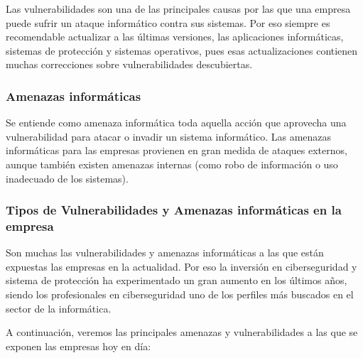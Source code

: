 \documentclass[12pt]{article}
\begin{document}
  Las vulnerabilidades son una de las principales causas por las que una empresa puede sufrir un ataque informático contra sus sistemas. Por eso siempre es recomendable actualizar a las últimas versiones, las aplicaciones informáticas, sistemas de protección y sistemas operativos, pues esas actualizaciones contienen muchas correcciones sobre vulnerabilidades descubiertas. 

  \subsubsection*{Amenazas informáticas}
  Se entiende como amenaza informática toda aquella acción que aprovecha una vulnerabilidad para atacar o invadir un sistema informático. Las amenazas informáticas para las empresas provienen en gran medida de ataques externos, aunque también existen amenazas internas (como robo de información o uso inadecuado de los sistemas).

  \subsubsection*{Tipos de Vulnerabilidades y Amenazas informáticas en la empresa}
  Son muchas las vulnerabilidades y amenazas informáticas a las que están expuestas las empresas en la actualidad. Por eso la inversión en ciberseguridad y sistema de protección ha experimentado un gran aumento en los últimos años, siendo los profesionales en ciberseguridad uno de los perfiles más buscados en el sector de la informática. 

  A continuación, veremos las principales amenazas y vulnerabilidades a las que se exponen las empresas hoy en día: 
\end{document}
